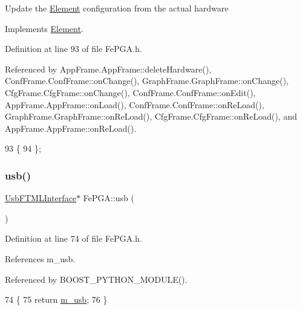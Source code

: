 Update the \hyperlink{classElement}{Element} configuration from the actual hardware 

Implements \hyperlink{classElement_a4e6c83efae95616ebddd03c793a26661}{Element}.



Definition at line 93 of file Fe\+P\+G\+A.\+h.



Referenced by App\+Frame.\+App\+Frame\+::delete\+Hardware(), Conf\+Frame.\+Conf\+Frame\+::on\+Change(), Graph\+Frame.\+Graph\+Frame\+::on\+Change(), Cfg\+Frame.\+Cfg\+Frame\+::on\+Change(), Conf\+Frame.\+Conf\+Frame\+::on\+Edit(), App\+Frame.\+App\+Frame\+::on\+Load(), Conf\+Frame.\+Conf\+Frame\+::on\+Re\+Load(), Graph\+Frame.\+Graph\+Frame\+::on\+Re\+Load(), Cfg\+Frame.\+Cfg\+Frame\+::on\+Re\+Load(), and App\+Frame.\+App\+Frame\+::on\+Re\+Load().


\begin{DoxyCode}
93                  \{
94   \};
\end{DoxyCode}
\mbox{\label{classFePGA_a4a7889dc3c2f88f623876ca475e66410}} 
\subsubsection{\texorpdfstring{usb()}{usb()}}
{\footnotesize\ttfamily \hyperlink{classUsbFTMLInterface}{Usb\+F\+T\+M\+L\+Interface}$\ast$ Fe\+P\+G\+A\+::usb (\begin{DoxyParamCaption}{ }\end{DoxyParamCaption})\hspace{0.3cm}{\ttfamily [inline]}}



Definition at line 74 of file Fe\+P\+G\+A.\+h.



References m\+\_\+usb.



Referenced by B\+O\+O\+S\+T\+\_\+\+P\+Y\+T\+H\+O\+N\+\_\+\+M\+O\+D\+U\+L\+E().


\begin{DoxyCode}
74                          \{
75     \textcolor{keywordflow}{return} \hyperlink{classFePGA_afb7947e600a66d914ee524acec3d8b1f}{m\_usb};
76   \}
\end{DoxyCode}
\mbox{\label{classObject_a83d2db2df682907ea1115ad721c1c4a1}} 
